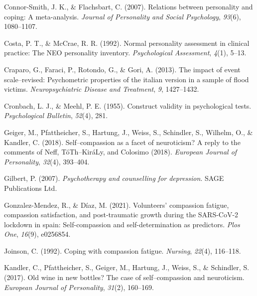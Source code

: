 \documentclass[
  man]{apa7}
\newlength{\cslhangindent}
\newlength{\cslentryspacingunit} %
\newenvironment{CSLReferences}[2] %
 {%
  \setlength{\parindent}{0pt}
  \ifodd #1
  \let\oldpar\par
  \def\par{\hangindent=\cslhangindent\oldpar}
  \fi
  \setlength{\parskip}{#2\cslentryspacingunit}
 }%
 {}
\begin{document}
\begin{CSLReferences}{1}{0}
\leavevmode{}%
Connor-Smith, J. K., \& Flachsbart, C. (2007). Relations between personality and coping: A meta-analysis. \emph{Journal of Personality and Social Psychology}, \emph{93}(6), 1080--1107.

\leavevmode{}%
Costa, P. T., \& McCrae, R. R. (1992). Normal personality assessment in clinical practice: The NEO personality inventory. \emph{Psychological Assessment}, \emph{4}(1), 5--13.

\leavevmode{}%
Craparo, G., Faraci, P., Rotondo, G., \& Gori, A. (2013). The impact of event scale--revised: Psychometric properties of the italian version in a sample of flood victims. \emph{Neuropsychiatric Disease and Treatment}, \emph{9}, 1427--1432.

\leavevmode{}%
Cronbach, L. J., \& Meehl, P. E. (1955). Construct validity in psychological tests. \emph{Psychological Bulletin}, \emph{52}(4), 281.

\leavevmode{}%
Geiger, M., Pfattheicher, S., Hartung, J., Weiss, S., Schindler, S., Wilhelm, O., \& Kandler, C. (2018). Self--compassion as a facet of neuroticism? A reply to the comments of {Neff, T{ó}Th--Kir{á}Ly, and Colosimo (2018)}. \emph{European Journal of Personality}, \emph{32}(4), 393--404.

\leavevmode{}%
Gilbert, P. (2007). \emph{Psychotherapy and counselling for depression}. SAGE Publications Ltd.

\leavevmode{}%
Gonzalez-Mendez, R., \& Díaz, M. (2021). Volunteers' compassion fatigue, compassion satisfaction, and post-traumatic growth during the SARS-CoV-2 lockdown in spain: Self-compassion and self-determination as predictors. \emph{Plos One}, \emph{16}(9), e0256854.

\leavevmode{}%
Joinson, C. (1992). Coping with compassion fatigue. \emph{Nursing}, \emph{22}(4), 116--118.

\leavevmode{}%
Kandler, C., Pfattheicher, S., Geiger, M., Hartung, J., Weiss, S., \& Schindler, S. (2017). Old wine in new bottles? The case of self--compassion and neuroticism. \emph{European Journal of Personality}, \emph{31}(2), 160--169.


\end{CSLReferences}
\end{document}
